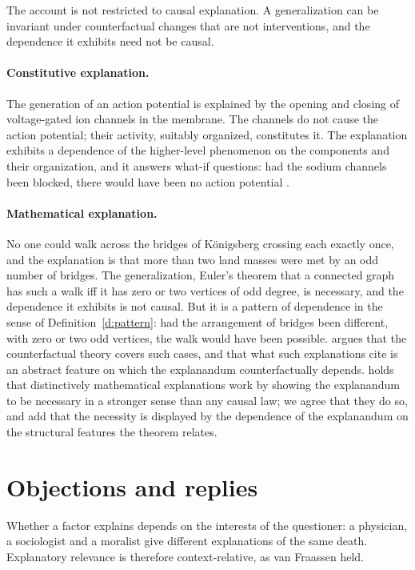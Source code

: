 \documentclass{situationist-preprint}
\begin{document}
The account is not restricted to causal explanation. A generalization can be invariant under counterfactual changes that are not interventions, and the dependence it exhibits need not be causal.

\paragraph{Constitutive explanation.} The generation of an action potential is explained by the opening and closing of voltage-gated ion channels in the membrane. The channels do not cause the action potential; their activity, suitably organized, constitutes it. The explanation exhibits a dependence of the higher-level phenomenon on the components and their organization, and it answers what-if questions: had the sodium channels been blocked, there would have been no action potential \citep{Craver2007}.

\paragraph{Mathematical explanation.} No one could walk across the bridges of K\"onigsberg crossing each exactly once, and the explanation is that more than two land masses were met by an odd number of bridges. The generalization, Euler's theorem that a connected graph has such a walk iff it has zero or two vertices of odd degree, is necessary, and the dependence it exhibits is not causal. But it is a pattern of dependence in the sense of Definition~\ref{d:pattern}: had the arrangement of bridges been different, with zero or two odd vertices, the walk would have been possible. \citet{Reutlinger2016} argues that the counterfactual theory covers such cases, and \citet{JanssonSaatsi2019} that what such explanations cite is an abstract feature on which the explanandum counterfactually depends. \citet{Lange2017} holds that distinctively mathematical explanations work by showing the explanandum to be necessary in a stronger sense than any causal law; we agree that they do so, and add that the necessity is displayed by the dependence of the explanandum on the structural features the theorem relates.

\section{Objections and replies}\label{s:objections}

\begin{objection}[Context]
Whether a factor explains depends on the interests of the questioner: a physician, a sociologist and a moralist give different explanations of the same death. Explanatory relevance is therefore context-relative, as van Fraassen held.
\end{objection}
\end{document}
